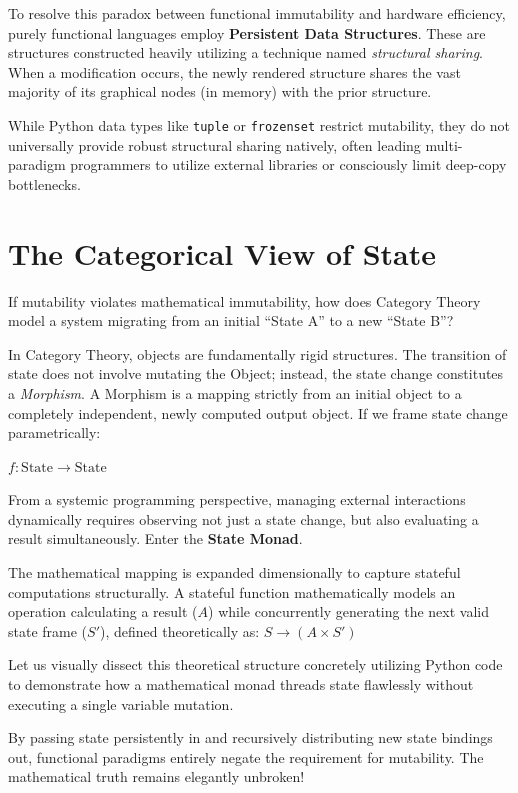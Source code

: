 To resolve this paradox between functional immutability and hardware efficiency, purely functional languages employ \textbf{Persistent Data Structures}. These are structures constructed heavily utilizing a technique named \textit{structural sharing}. When a modification occurs, the newly rendered structure shares the vast majority of its graphical nodes (in memory) with the prior structure. 



While Python data types like \texttt{tuple} or \texttt{frozenset} restrict mutability, they do not universally provide robust structural sharing natively, often leading multi-paradigm programmers to utilize external libraries or consciously limit deep-copy bottlenecks.

\section{The Categorical View of State}

If mutability violates mathematical immutability, how does Category Theory model a system migrating from an initial ``State A'' to a new ``State B''? 

In Category Theory, objects are fundamentally rigid structures. The transition of state does not involve mutating the Object; instead, the state change constitutes a \textit{Morphism}. A Morphism is a mapping strictly from an initial object to a completely independent, newly computed output object. If we frame state change parametrically: 

$f: \text{State} \rightarrow \text{State}$

From a systemic programming perspective, managing external interactions dynamically requires observing not just a state change, but also evaluating a result simultaneously. Enter the \textbf{State Monad}.

The mathematical mapping is expanded dimensionally to capture stateful computations structurally. A stateful function mathematically models an operation calculating a result ($A$) while concurrently generating the next valid state frame ($S'$), defined theoretically as:
$S \rightarrow (A \times S')$

Let us visually dissect this theoretical structure concretely utilizing Python code to demonstrate how a mathematical monad threads state flawlessly without executing a single variable mutation.



By passing state persistently in and recursively distributing new state bindings out, functional paradigms entirely negate the requirement for mutability. The mathematical truth remains elegantly unbroken!
